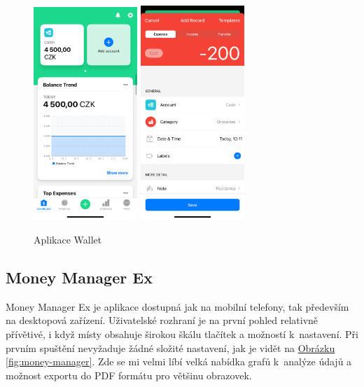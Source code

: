 \documentclass[
  biblatex,
  figures=true,
  tables=false,
  glossaries,
  index
]{kidiplom}
\begin{document}
\begin{figure}
  \centering
  \includegraphics[width=0.35\textwidth]{images/wallet1.PNG}
    \hspace{10px}
    \includegraphics[width=0.35\textwidth]{images/wallet2.PNG}
  \caption{Aplikace Wallet}
  \label{fig:wallet}
\end{figure}

\subsection{Money Manager Ex}
Money Manager Ex \cite{money-manager} je aplikace dostupná jak na mobilní telefony, tak především na desktopová zařízení. Uživatelské rozhraní je na první pohled relativně přívětivé, i když místy obsahuje širokou škálu tlačítek a možností k~nastavení. Při prvním spuštění nevyžaduje žádné složité nastavení, jak je vidět na \hyperref[fig:money-manager]{Obrázku \ref{fig:money-manager}}. Zde se mi velmi líbí velká nabídka grafů k~analýze údajů a možnost exportu do PDF formátu pro většinu obrazovek.
\end{document}
